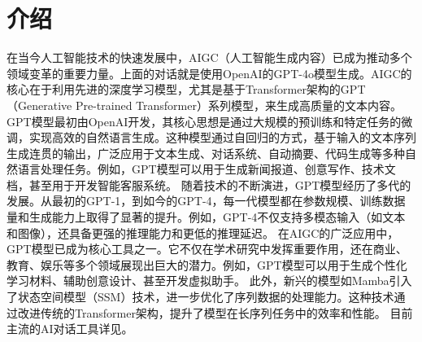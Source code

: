 \section{介绍}\label{sec:intro}




在当今人工智能技术的快速发展中，AIGC（人工智能生成内容）已成为推动多个领域变革的重要力量。上面的对话就是使用OpenAI的GPT-4o模型生成。AIGC的核心在于利用先进的深度学习模型，尤其是基于Transformer架构的GPT（Generative Pre-trained Transformer）系列模型，来生成高质量的文本内容。
GPT模型最初由OpenAI开发，其核心思想是通过大规模的预训练和特定任务的微调，实现高效的自然语言生成。这种模型通过自回归的方式，基于输入的文本序列生成连贯的输出，广泛应用于文本生成、对话系统、自动摘要、代码生成等多种自然语言处理任务。例如，GPT模型可以用于生成新闻报道、创意写作、技术文档，甚至用于开发智能客服系统。
随着技术的不断演进，GPT模型经历了多代的发展。从最初的GPT-1，到如今的GPT-4，每一代模型都在参数规模、训练数据量和生成能力上取得了显著的提升。例如，GPT-4不仅支持多模态输入（如文本和图像），还具备更强的推理能力和更低的推理延迟。
在AIGC的广泛应用中，GPT模型已成为核心工具之一。它不仅在学术研究中发挥重要作用，还在商业、教育、娱乐等多个领域展现出巨大的潜力。例如，GPT模型可以用于生成个性化学习材料、辅助创意设计、甚至开发虚拟助手。
此外，新兴的模型如Mamba引入了状态空间模型（SSM）技术，进一步优化了序列数据的处理能力。这种技术通过改进传统的Transformer架构，提升了模型在长序列任务中的效率和性能。
目前主流的AI对话工具详见。

